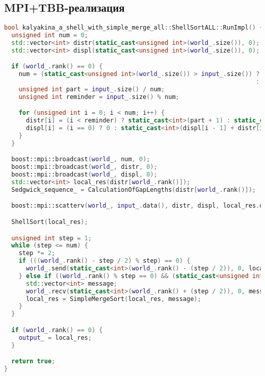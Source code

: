 \documentclass[a4paper,14pt]{extarticle}
\begin{document}
\subsection*{MPI+TBB-реализация}

\begin{lstlisting}[language=C++]
bool kalyakina_a_shell_with_simple_merge_all::ShellSortALL::RunImpl() {
  unsigned int num = 0;
  std::vector<int> distr(static_cast<unsigned int>(world_.size()), 0);
  std::vector<int> displ(static_cast<unsigned int>(world_.size()), 0);

  if (world_.rank() == 0) {
    num = (static_cast<unsigned int>(world_.size()) > input_.size()) ? input_.size()
                                                                     : static_cast<unsigned int>(world_.size());
    unsigned int part = input_.size() / num;
    unsigned int reminder = input_.size() % num;

    for (unsigned int i = 0; i < num; i++) {
      distr[i] = (i < reminder) ? static_cast<int>(part + 1) : static_cast<int>(part);
      displ[i] = (i == 0) ? 0 : static_cast<int>(displ[i - 1] + distr[i - 1]);
    }
  }

  boost::mpi::broadcast(world_, num, 0);
  boost::mpi::broadcast(world_, distr, 0);
  boost::mpi::broadcast(world_, displ, 0);
  std::vector<int> local_res(distr[world_.rank()]);
  Sedgwick_sequence_ = CalculationOfGapLengths(distr[world_.rank()]);

  boost::mpi::scatterv(world_, input_.data(), distr, displ, local_res.data(), distr[world_.rank()], 0);

  ShellSort(local_res);

  unsigned int step = 1;
  while (step <= num) {
    step *= 2;
    if (((world_.rank() - step / 2) % step) == 0) {
      world_.send(static_cast<int>(world_.rank() - (step / 2)), 0, local_res);
    } else if ((world_.rank() % step == 0) && (static_cast<unsigned int>(world_.size()) > world_.rank() + step / 2)) {
      std::vector<int> message;
      world_.recv(static_cast<int>(world_.rank() + (step / 2)), 0, message);
      local_res = SimpleMergeSort(local_res, message);
    }
  }

  if (world_.rank() == 0) {
    output_ = local_res;
  }

  return true;
}



\end{lstlisting}
\end{document}
